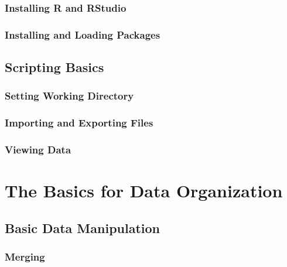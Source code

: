 \documentclass[
]{article}
\begin{document}
\hypertarget{installing-r-and-rstudio}{%
\subsubsection{Installing R and RStudio}\label{installing-r-and-rstudio}}

\hypertarget{installing-and-loading-packages}{%
\subsubsection{Installing and Loading Packages}\label{installing-and-loading-packages}}

\hypertarget{scripting-basics}{%
\subsection{Scripting Basics}\label{scripting-basics}}

\hypertarget{setting-working-directory}{%
\subsubsection{Setting Working Directory}\label{setting-working-directory}}

\hypertarget{importing-and-exporting-files}{%
\subsubsection{Importing and Exporting Files}\label{importing-and-exporting-files}}

\hypertarget{viewing-data}{%
\subsubsection{Viewing Data}\label{viewing-data}}

\hypertarget{dataorg}{%
\section{The Basics for Data Organization}\label{dataorg}}

\hypertarget{basic-data-manipulation}{%
\subsection{Basic Data Manipulation}\label{basic-data-manipulation}}

\hypertarget{merging}{%
\subsubsection{Merging}\label{merging}}
\end{document}
